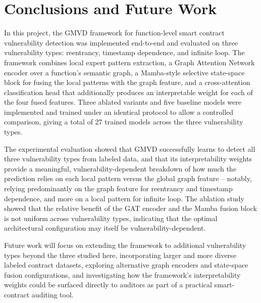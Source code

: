 \documentclass[12pt, a4paper, openright, twoside]{report}
\begin{document}
\chapter{Conclusions and Future Work}
\label{conclusion}
\begin{justifying}

In this project, the GMVD framework for function-level smart contract vulnerability detection was implemented end-to-end and evaluated on three vulnerability types: reentrancy, timestamp dependence, and infinite loop. The framework combines local expert pattern extraction, a Graph Attention Network encoder over a function's semantic graph, a Mamba-style selective state-space block for fusing the local patterns with the graph feature, and a cross-attention classification head that additionally produces an interpretable weight for each of the four fused features. Three ablated variants and five baseline models were implemented and trained under an identical protocol to allow a controlled comparison, giving a total of 27 trained models across the three vulnerability types.

The experimental evaluation showed that GMVD successfully learns to detect all three vulnerability types from labeled data, and that its interpretability weights provide a meaningful, vulnerability-dependent breakdown of how much the prediction relies on each local pattern versus the global graph feature -- notably, relying predominantly on the graph feature for reentrancy and timestamp dependence, and more on a local pattern for infinite loop. The ablation study showed that the relative benefit of the GAT encoder and the Mamba fusion block is not uniform across vulnerability types, indicating that the optimal architectural configuration may itself be vulnerability-dependent.

Future work will focus on extending the framework to additional vulnerability types beyond the three studied here, incorporating larger and more diverse labeled contract datasets, exploring alternative graph encoders and state-space fusion configurations, and investigating how the framework's interpretability weights could be surfaced directly to auditors as part of a practical smart-contract auditing tool.

\end{justifying}




% 
% 
\newpage
\end{document}
